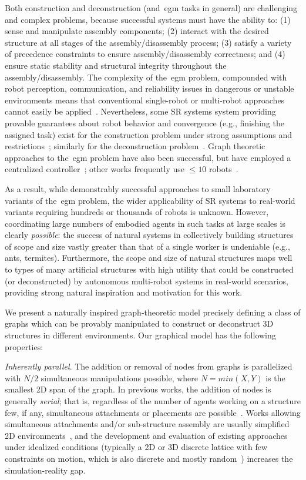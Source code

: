 Both construction and deconstruction (and~\gls{egm} tasks in general) are
challenging and complex problems, because successful systems must have the
ability to: (1) sense and manipulate assembly components; (2) interact with the
desired structure at all stages of the assembly/disassembly process; (3) satisfy
a variety of precedence constraints to ensure assembly/disassembly correctness;
and (4) ensure static stability and structural integrity throughout the
assembly/disassembly. The complexity of the~\gls{egm} problem, compounded with
robot perception, communication, and reliability issues in dangerous or unstable
environments means that conventional single-robot or multi-robot approaches
cannot easily be applied~\cite{Magnenat2012}. Nevertheless, some SR systems
system providing provable guarantees about robot behavior and convergence (e.g.,
finishing the assigned task) exist for the construction problem under strong
assumptions and restrictions~\cite{Petersen2011,Meng2008}; similarly for the
deconstruction problem~\cite{Petersen2011}.  Graph theoretic approaches to
the~\gls{egm} problem have also been successful, but have employed a centralized
controller~\cite{Worcester2011}; other works frequently use $\le 10$
robots~\cite{Worcester2011,Zhang2011,Allright2017,Zhang2008}.

As a result, while demonstrably successful approaches to small laboratory
variants of the~\gls{egm} problem, the wider applicability of SR systems to
real-world variants requiring hundreds or thousands of robots is unknown.
However, coordinating large numbers of embodied agents in such tasks at large
scales is clearly \emph{possible}: the success of natural systems in
collectively building structures of scope and size vastly greater than that of a
single worker is undeniable (e.g., ants, termites). Furthermore, the scope and
size of natural structures maps well to types of many artificial structures with
high utility that could be constructed (or deconstructed) by autonomous
multi-robot systems in real-world scenarios, providing strong natural
inspiration and motivation for this work.

We present a naturally inspired graph-theoretic model precisely defining a class
of graphs which can be provably manipulated to construct or deconstruct 3D
structures in different environments. Our graphical model has the following
properties:

\emph{Inherently parallel}. The addition or removal of nodes from graphs is
parallelized with $N/2$ simultaneous manipulations possible, where $N=min(X,Y)$
is the smallest 2D span of the graph. In previous works, the addition of nodes
is generally \emph{serial}; that is, regardless of the number of agents working
on a structure few, if any, simultaneous attachments or placements are
possible~\cite{Petersen2011,Werfel2011,Worcester2011}. Works allowing
simultaneous attachments and/or sub-structure assembly are usually simplified 2D
environments~\cite{Meng2008,Zhang2011,Matthey2009}, and the development and
evaluation of existing approaches under idealized conditions (typically a 2D or
3D discrete lattice with few constraints on motion, which is also discrete and
mostly random~\cite{Grushin2006,Theraulaz1995}) increases the simulation-reality
gap.

